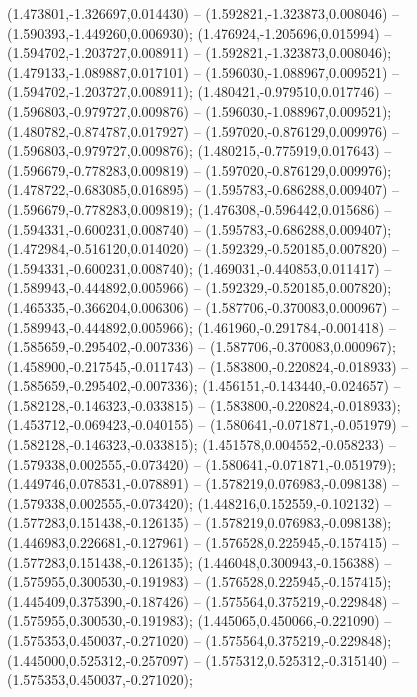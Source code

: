  (1.473801,-1.326697,0.014430) -- (1.592821,-1.323873,0.008046) -- (1.590393,-1.449260,0.006930);
 (1.476924,-1.205696,0.015994) -- (1.594702,-1.203727,0.008911) -- (1.592821,-1.323873,0.008046);
 (1.479133,-1.089887,0.017101) -- (1.596030,-1.088967,0.009521) -- (1.594702,-1.203727,0.008911);
 (1.480421,-0.979510,0.017746) -- (1.596803,-0.979727,0.009876) -- (1.596030,-1.088967,0.009521);
 (1.480782,-0.874787,0.017927) -- (1.597020,-0.876129,0.009976) -- (1.596803,-0.979727,0.009876);
 (1.480215,-0.775919,0.017643) -- (1.596679,-0.778283,0.009819) -- (1.597020,-0.876129,0.009976);
 (1.478722,-0.683085,0.016895) -- (1.595783,-0.686288,0.009407) -- (1.596679,-0.778283,0.009819);
 (1.476308,-0.596442,0.015686) -- (1.594331,-0.600231,0.008740) -- (1.595783,-0.686288,0.009407);
 (1.472984,-0.516120,0.014020) -- (1.592329,-0.520185,0.007820) -- (1.594331,-0.600231,0.008740);
 (1.469031,-0.440853,0.011417) -- (1.589943,-0.444892,0.005966) -- (1.592329,-0.520185,0.007820);
 (1.465335,-0.366204,0.006306) -- (1.587706,-0.370083,0.000967) -- (1.589943,-0.444892,0.005966);
 (1.461960,-0.291784,-0.001418) -- (1.585659,-0.295402,-0.007336) -- (1.587706,-0.370083,0.000967);
 (1.458900,-0.217545,-0.011743) -- (1.583800,-0.220824,-0.018933) -- (1.585659,-0.295402,-0.007336);
 (1.456151,-0.143440,-0.024657) -- (1.582128,-0.146323,-0.033815) -- (1.583800,-0.220824,-0.018933);
 (1.453712,-0.069423,-0.040155) -- (1.580641,-0.071871,-0.051979) -- (1.582128,-0.146323,-0.033815);
 (1.451578,0.004552,-0.058233) -- (1.579338,0.002555,-0.073420) -- (1.580641,-0.071871,-0.051979);
 (1.449746,0.078531,-0.078891) -- (1.578219,0.076983,-0.098138) -- (1.579338,0.002555,-0.073420);
 (1.448216,0.152559,-0.102132) -- (1.577283,0.151438,-0.126135) -- (1.578219,0.076983,-0.098138);
 (1.446983,0.226681,-0.127961) -- (1.576528,0.225945,-0.157415) -- (1.577283,0.151438,-0.126135);
 (1.446048,0.300943,-0.156388) -- (1.575955,0.300530,-0.191983) -- (1.576528,0.225945,-0.157415);
 (1.445409,0.375390,-0.187426) -- (1.575564,0.375219,-0.229848) -- (1.575955,0.300530,-0.191983);
 (1.445065,0.450066,-0.221090) -- (1.575353,0.450037,-0.271020) -- (1.575564,0.375219,-0.229848);
 (1.445000,0.525312,-0.257097) -- (1.575312,0.525312,-0.315140) -- (1.575353,0.450037,-0.271020);
